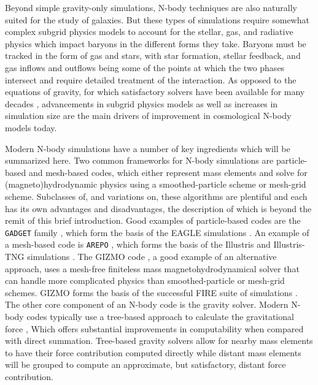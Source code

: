 Beyond simple gravity-only simulations, N-body techniques are also naturally suited for the study of galaxies. But these types of simulations require somewhat complex subgrid physics models to account for the stellar, gas, and radiative physics which impact baryons in the different forms they take. Baryons must be tracked in the form of gas and stars, with star formation, stellar feedback, and gas inflows and outflows being some of the points at which the two phases intersect and require detailed treatment of the interaction. As opposed to the equations of gravity, for which satisfactory solvers have been available for many decades \parencite[e.g.][]{barnes86}, advancements in subgrid physics models as well as increases in simulation size are the main drivers of improvement in cosmological N-body models today.

Modern N-body simulations have a number of key ingredients which will be summarized here. Two common frameworks for N-body simulations are particle-based and mesh-based codes, which either represent mass elements and solve for (magneto)hydrodynamic physics using a smoothed-particle scheme or mesh-grid scheme. Subclasses of, and variations on, these algorithms are plentiful and each has its own advantages and disadvantages, the description of which is beyond the remit of this brief introduction. Good examples of particle-based codes are the \texttt{GADGET} family \parencite{gadget2_springel05,gadget4_springel21}, which form the basis of the EAGLE simulations \parencite{schaye15}. An example of a mesh-based code is \texttt{AREPO} \parencite{arepo_springel10}, which forms the basis of the Illustris and Illustris-TNG simulations \parencite{illustris_vogelsberger14,tng_model_pillepich18}. The GIZMO code \parencite{gizmo_hopkins15}, a good example of an alternative approach, uses a mesh-free finiteless mass magnetohydrodynamical solver that can handle more complicated physics than smoothed-particle or mesh-grid schemes. GIZMO forms the basis of the successful FIRE suite of simulations \parencite{wetzel16,FIRE2_model_hopkins18}. The other core component of an N-body code is the gravity solver. Modern N-body codes typically use a tree-based approach to calculate the gravitational force \parencite[e.g.][]{barnes86}, Which offers substantial improvements in computability when compared with direct summation. Tree-based gravity solvers allow for nearby mass elements to have their force contribution computed directly while distant mass elements will be grouped to compute an approximate, but satisfactory, distant force contribution.

